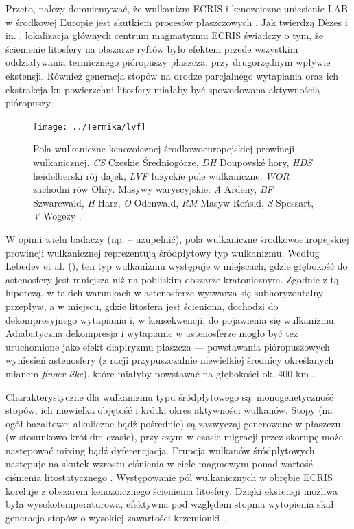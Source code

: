 \documentclass[11.5pt,twoside]{report}
\begin{document}
Przeto, należy domniemywać, że wulkanizm ECRIS i kenozoiczne uniesienie LAB w środkowej Europie jest skutkiem procesów płaszczowych \parencite{Meier.2016}. Jak twierdzą D\`{e}zes i in. \cite{Dezes.2004}, lokalizacja głównych centrum magmatyzmu ECRIS świadczy o tym, że ścienienie litosfery na obszarze ryftów było efektem przede wszystkim oddziaływania termicznego pióropuszy płaszcza, przy drugorzędnym wpływie ekstensji. Również generacja stopów na drodze parcjalnego wytapiania oraz ich ekstrakcja ku powierzchni litosfery miałaby być spowodowana aktywnością pióropuszy.
 
 
 \begin{figure}[h]
 	\centering
 	\texttt{[image: ../Termika/lvf]}
 	\caption{Pola wulkaniczne kenozoicznej środkowoeuropejskiej prowincji wulkanicznej. \textit{CS} Czeskie Średniogórze, \textit{DH} Doupovsk\'{e} hory, \textit{HDS} heidelberski rój dajek, \textit{LVF} łużyckie pole wulkaniczne, \textit{WOR} zachodni rów Oh\v{r}y. Masywy waryscyjskie: \textit{A} Ardeny, \textit{BF} Szwarcwald, \textit{H} Harz, \textit{O} Odenwald, \textit{RM} Masyw Reński, \textit{S} Spessart, \textit{V} Wogezy \parencite{Buchner.2015}.} 
 	\label{Fig.}
 \end{figure}
 
 W opinii wielu badaczy (np. \cite{Wilson.2006} -- uzupelnić), pola wulkaniczne środkowoeuropejskiej prowincji wulkanicznej reprezentują śródpłytowy typ wulkanizmu. Według Lebedev et al. (\citeyear{Lebedev.2006}), ten typ wulkanizmu występuje w miejscach, gdzie głębokość do astenosfery jest mniejsza niż na pobliskim obszarze kratonicznym. Zgodnie z tą hipotezą, w takich warunkach w astenosferze wytwarza się subhoryzontalny przepływ, a w miejscu, gdzie litosfera jest ścieniona, dochodzi do dekompresyjnego wytapiania i, w konsekwencji, do pojawienia się wulkanizmu. Adiabatyczna dekompresja i wytapianie w astenosferze mogło być też uruchomione jako efekt diapiryzmu płaszcza --- powstawania pióropuszowych wyniesień astenosfery (z racji przypuszczalnie niewielkiej średnicy określanych mianem \textit{finger-like}), które miałyby powstawać na głębokości ok. 400 km \parencite{Wilson.2006}. 
 
 Charakterystyczne dla wulkanizmu typu śródpłytowego są: monogenetyczność stopów, ich niewielka objętość i krótki okres aktywności wulkanów. Stopy (na ogół bazaltowe; alkaliczne bąd\'{z} pośrednie) są zazwyczaj generowane w płaszczu (w stosunkowo krótkim czasie), przy czym w czasie migracji przez skorupę może następować mixing bąd\'{z} dyferencjacja. Erupcja wulkanów śródpłytowych następuje na skutek wzrostu ciśnienia w ciele magmowym ponad wartość ciśnienia litostatycznego \parencite{Kereszturi.2013}. Występowanie pól wulkanicznych w obrębie ECRIS koreluje z obszarem kenozoicznego ścienienia litosfery. Dzięki ekstensji możliwa była wysokotemperaturowa, efektywna pod względem stopnia wytopienia skał generacja stopów o wysokiej zawartości krzemionki \parencite{Meier.2016}.
 
\end{document}
